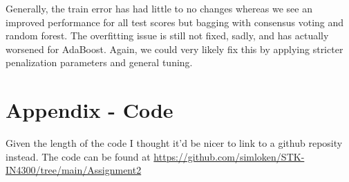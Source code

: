 \documentclass{article}
\begin{document}
Generally, the train error has had little to no changes whereas we see an improved performance for all test scores but bagging with consensus voting and random forest. The overfitting issue is still not fixed, sadly, and has actually worsened for AdaBoost. Again, we could very likely fix this by applying stricter penalization parameters and general tuning.


\newpage
\section*{Appendix - Code}
Given the length of the code I thought it'd be nicer to link to a github reposity instead. \newline
The code can be found at \url{https://github.com/simloken/STK-IN4300/tree/main/Assignment2}
\end{document}
